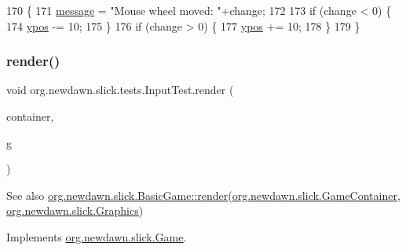 \begin{DoxyCode}
170                                             \{
171         \mbox{\hyperlink{classorg_1_1newdawn_1_1slick_1_1tests_1_1_input_test_a998b4c1fcea34c27835b531bd6afa539}{message}} = \textcolor{stringliteral}{"Mouse wheel moved: "}+change;
172         
173         \textcolor{keywordflow}{if} (change < 0) \{
174             \mbox{\hyperlink{classorg_1_1newdawn_1_1slick_1_1tests_1_1_input_test_ad460e38695c9ef5b29ee97c5d88feac5}{ypos}} -= 10;
175         \} 
176         \textcolor{keywordflow}{if} (change > 0) \{
177             \mbox{\hyperlink{classorg_1_1newdawn_1_1slick_1_1tests_1_1_input_test_ad460e38695c9ef5b29ee97c5d88feac5}{ypos}} += 10;
178         \} 
179     \}
\end{DoxyCode}
\mbox{\label{classorg_1_1newdawn_1_1slick_1_1tests_1_1_input_test_a32403d8a2b9ea3a1866d22249272850d}} 
\subsubsection{\texorpdfstring{render()}{render()}}
{\footnotesize\ttfamily void org.\+newdawn.\+slick.\+tests.\+Input\+Test.\+render (\begin{DoxyParamCaption}\item[{\mbox{\hyperlink{classorg_1_1newdawn_1_1slick_1_1_game_container}{Game\+Container}}}]{container,  }\item[{\mbox{\hyperlink{classorg_1_1newdawn_1_1slick_1_1_graphics}{Graphics}}}]{g }\end{DoxyParamCaption})\hspace{0.3cm}{\ttfamily [inline]}}

\begin{DoxySeeAlso}{See also}
\mbox{\hyperlink{interfaceorg_1_1newdawn_1_1slick_1_1_game_af1a4670d43eb3ba04dfcf55ab1975b64}{org.\+newdawn.\+slick.\+Basic\+Game\+::render}}(\mbox{\hyperlink{classorg_1_1newdawn_1_1slick_1_1_game_container}{org.\+newdawn.\+slick.\+Game\+Container}}, \mbox{\hyperlink{classorg_1_1newdawn_1_1slick_1_1_graphics}{org.\+newdawn.\+slick.\+Graphics}}) 
\end{DoxySeeAlso}


Implements \mbox{\hyperlink{interfaceorg_1_1newdawn_1_1slick_1_1_game_af1a4670d43eb3ba04dfcf55ab1975b64}{org.\+newdawn.\+slick.\+Game}}.


